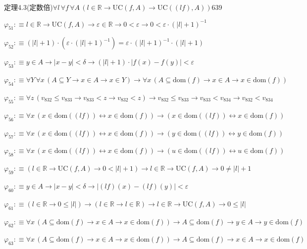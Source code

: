 \begin{fullproof}{定理4.3(定数倍)}{$\forall l\,\forall f\,\forall A\,(l \in \mathbb{R} \to \mathrm{UC}(f,A) \to \mathrm{UC}((l f),A))$}{639}
\begin{abbrevlist}
\item $\varphi_{51} :\equiv l \in \mathbb{R} \to \mathrm{UC}(f,A) \to \varepsilon \in \mathbb{R} \to 0 < \varepsilon \to 0 < \varepsilon \cdot (\lvert l \rvert + 1)^{-1}$
\item $\varphi_{52} :\equiv (\lvert l \rvert + 1) \cdot (\varepsilon \cdot (\lvert l \rvert + 1)^{-1}) = \varepsilon \cdot (\lvert l \rvert + 1)^{-1} \cdot (\lvert l \rvert + 1)$
\item $\varphi_{53} :\equiv y \in A \to \lvert x - y \rvert < \delta \to (\lvert l \rvert + 1) \cdot \lvert f(x) - f(y) \rvert < \varepsilon$
\item $\varphi_{54} :\equiv \forall Y\,\forall x\,(A \subseteq Y \to x \in A \to x \in Y) \to \forall x\,(A \subseteq \mathrm{dom}(f) \to x \in A \to x \in \mathrm{dom}(f))$
\item $\varphi_{55} :\equiv \forall z\,(v_{832} \leq v_{833} \to v_{833} < z \to v_{832} < z) \to v_{832} \leq v_{833} \to v_{833} < v_{834} \to v_{832} < v_{834}$
\item $\varphi_{56} :\equiv \forall x\,(x \in \mathrm{dom}((l f)) \leftrightarrow x \in \mathrm{dom}(f)) \to (x \in \mathrm{dom}((l f)) \leftrightarrow x \in \mathrm{dom}(f))$
\item $\varphi_{57} :\equiv \forall x\,(x \in \mathrm{dom}((l f)) \leftrightarrow x \in \mathrm{dom}(f)) \to (y \in \mathrm{dom}((l f)) \leftrightarrow y \in \mathrm{dom}(f))$
\item $\varphi_{58} :\equiv \forall x\,(x \in \mathrm{dom}((l f)) \leftrightarrow x \in \mathrm{dom}(f)) \to (u \in \mathrm{dom}((l f)) \leftrightarrow u \in \mathrm{dom}(f))$
\item $\varphi_{59} :\equiv (l \in \mathbb{R} \to \mathrm{UC}(f,A) \to 0 < \lvert l \rvert + 1) \to l \in \mathbb{R} \to \mathrm{UC}(f,A) \to 0 \neq \lvert l \rvert + 1$
\item $\varphi_{60} :\equiv y \in A \to \lvert x - y \rvert < \delta \to \lvert (l f)(x) - (l f)(y) \rvert < \varepsilon$
\item $\varphi_{61} :\equiv (l \in \mathbb{R} \to 0 \leq \lvert l \rvert) \to (l \in \mathbb{R} \to l \in \mathbb{R}) \to l \in \mathbb{R} \to \mathrm{UC}(f,A) \to 0 \leq \lvert l \rvert$
\item $\varphi_{62} :\equiv \forall x\,(A \subseteq \mathrm{dom}(f) \to x \in A \to x \in \mathrm{dom}(f)) \to A \subseteq \mathrm{dom}(f) \to y \in A \to y \in \mathrm{dom}(f)$
\item $\varphi_{63} :\equiv \forall x\,(A \subseteq \mathrm{dom}(f) \to x \in A \to x \in \mathrm{dom}(f)) \to A \subseteq \mathrm{dom}(f) \to x \in A \to x \in \mathrm{dom}(f)$

\end{abbrevlist}
\end{fullproof}
